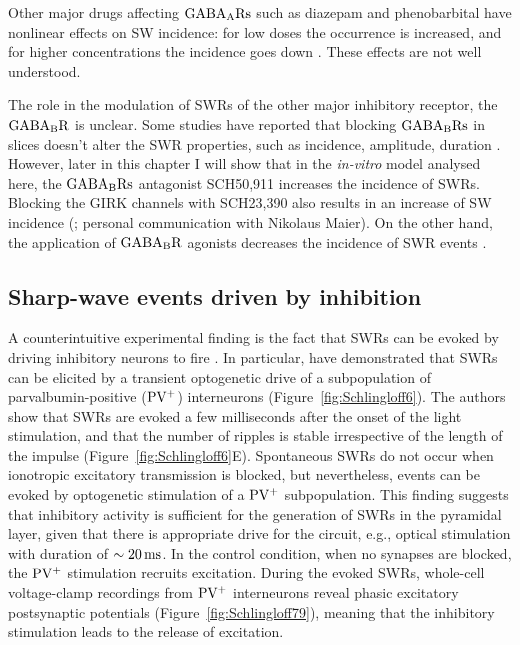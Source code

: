     Other major drugs affecting $\rm GABA_A Rs$ such as diazepam and
    phenobarbital have nonlinear effects on SW incidence: for low doses
    the occurrence is increased, and for higher concentrations the incidence
    goes down \citep{Papatheodoropoulos2007, Koniaris2011}. These effects are
    not well understood.
  
    The role in the modulation of SWRs of the other major inhibitory receptor,
    the $\rm GABA_B R$ is unclear. Some studies have reported that blocking
    $\rm GABA_B Rs$ in slices doesn't alter the SWR properties, such as
    incidence, amplitude, duration \citep{Hollnagel2014, Hofer2015}. However,
    later in this chapter I will show that in the \textit{in-vitro} model
    analysed here, the $\rm GABA_B Rs$ antagonist SCH50,911 increases the
    incidence of SWRs. Blocking the GIRK channels with SCH23,390 also results
    in an increase of SW incidence (\citealp{Maier2012}; personal communication
    with Nikolaus Maier). On the other hand, the application of $\rm GABA_B R$
    agonists decreases the incidence of SWR events \citep{Maier2012,
    Hollnagel2014}.


  \subsection{Sharp-wave events driven by inhibition}
    A counterintuitive experimental finding is the fact that SWRs can be evoked
    by driving inhibitory neurons to fire \citep{Ellender2010, Schlingloff2014,
    Kohus2016}. In particular, \cite{Schlingloff2014} have demonstrated that
    SWRs can be elicited by a transient optogenetic drive of a subpopulation of
    parvalbumin-positive ($\rm PV^+$) interneurons
    (Figure~\ref{fig:Schlingloff6}). The authors show that SWRs are evoked a
    few milliseconds after the onset of the light stimulation, and that the
    number of ripples is stable irrespective of the length of the impulse
    (Figure~\ref{fig:Schlingloff6}E). Spontaneous SWRs do not occur when
    ionotropic excitatory transmission is blocked, but nevertheless, events can
    be evoked by optogenetic stimulation of a $\rm PV^+$ subpopulation. This
    finding suggests that inhibitory activity is sufficient for the generation
    of SWRs in the pyramidal layer, given that there is appropriate drive for
    the circuit, e.g., optical stimulation with duration of $\sim 20 \, \rm
    ms$. In the control condition, when no synapses are blocked, the $\rm PV^+$
    stimulation recruits excitation. During the evoked SWRs, whole-cell
    voltage-clamp recordings from $\rm PV^+$ interneurons reveal phasic
    excitatory postsynaptic potentials (Figure~\ref{fig:Schlingloff79}),
    meaning that the inhibitory stimulation leads to the release of excitation.

